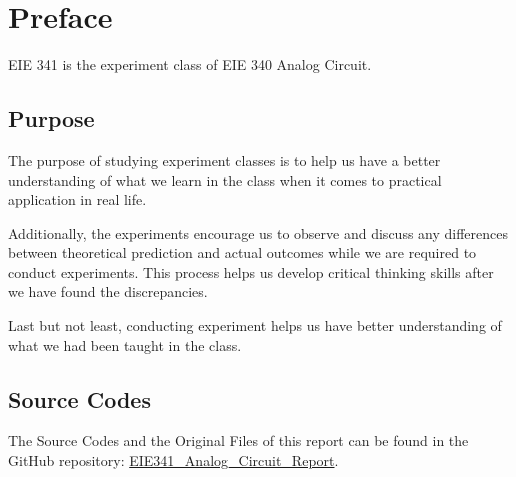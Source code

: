 \chapter*{Preface}
\Large EIE 341 is the experiment class of EIE 340 Analog Circuit.\par

\section{Purpose}

The purpose of studying experiment classes is to help us have a
better understanding of what we learn in the class when it comes to practical application in real life.\par

Additionally, the experiments encourage us to observe and discuss any differences between theoretical prediction and actual outcomes while we are required to conduct experiments. This process helps us develop critical thinking skills after we have found the discrepancies.\par

Last but not least, conducting experiment helps us have better understanding of what we had been taught in the class.

\section{Source Codes}
The Source Codes and the Original Files of this report can be found in the GitHub repository: 
    \href{https://github.com/SalmonSeanZ/EIE341_Analog_Circuit_Report}
        {EIE341\_Analog\_Circuit\_Report}.
\FloatBarrier